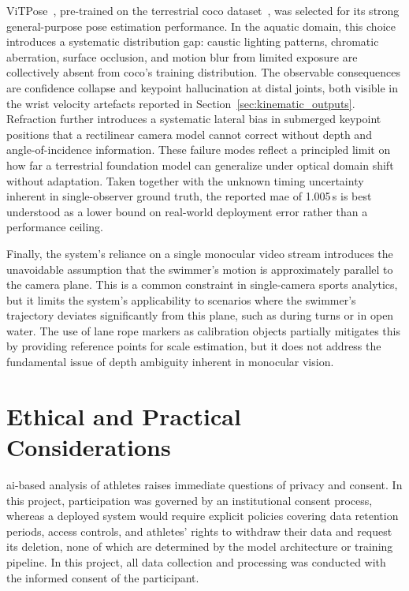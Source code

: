 ViTPose~\cite{xu2022vitpose}, pre-trained on the terrestrial \gls{coco}
dataset~\cite{lin2014microsoft}, was selected for its strong general-purpose pose estimation
performance. In the aquatic domain, this choice introduces a systematic distribution gap:
caustic lighting patterns, chromatic aberration, surface occlusion, and motion blur from
limited exposure are collectively absent from \gls{coco}'s training distribution. The observable
consequences are confidence collapse and keypoint hallucination at distal joints, both visible
in the wrist velocity artefacts reported in Section~\ref{sec:kinematic_outputs}. Refraction
further introduces a systematic lateral bias in submerged keypoint positions that a
rectilinear camera model cannot correct without depth and angle-of-incidence information.
These failure modes reflect a principled limit on how far a terrestrial foundation model can
generalize under optical domain shift without adaptation. Taken together with the unknown
timing uncertainty inherent in single-observer ground truth, the reported \gls{mae} of 1.005\,s is
best understood as a lower bound on real-world deployment error rather than a performance
ceiling.

Finally, the system's reliance on a single monocular video stream introduces the unavoidable assumption that the swimmer's motion is approximately parallel to the camera plane. This is a common constraint in single-camera sports analytics, but it limits the system's applicability to scenarios where the swimmer's trajectory deviates significantly from this plane, such as during turns or in open water. The use of lane rope markers as calibration objects partially mitigates this by providing reference points for scale estimation, but it does not address the fundamental issue of depth ambiguity inherent in monocular vision. 

\section{Ethical and Practical Considerations}

\gls{ai}-based analysis of athletes raises immediate questions of privacy and consent. In this
project, participation was governed by an institutional consent process, whereas a deployed system
would require explicit policies covering data retention periods, access controls, and
athletes' rights to withdraw their data and request its deletion, none of which are determined
by the model architecture or training pipeline. In this project, all data collection and processing was conducted with the informed consent of the participant.

